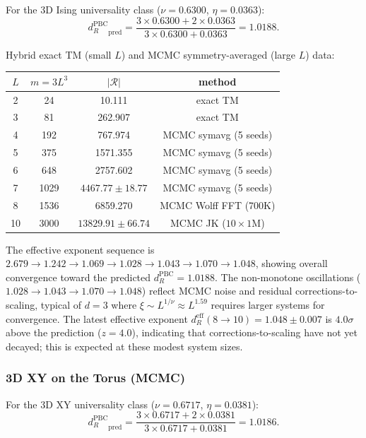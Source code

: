 \documentclass[11pt]{article}
\theoremstyle{definition}
\theoremstyle{remark}
\newcommand{\Scal}{\mathcal{R}}
\begin{document}
For the 3D Ising universality class ($\nu = 0.6300$, $\eta = 0.0363$):
\begin{equation}
  {d_R^{\mathrm{PBC}}}_{\text{pred}} = \frac{3 \times 0.6300 + 2 \times 0.0363}
    {3 \times 0.6300 + 0.0363} = 1.0188.
  \label{eq:pbc-3d-pred}
\end{equation}

Hybrid exact TM (small $L$) and MCMC symmetry-averaged (large $L$) data:

\begin{center}
\renewcommand{\arraystretch}{1.2}
\begin{tabular}{cccc}
\toprule
$L$ & $m = 3L^3$ & $|\Scal|$ & method \\
\midrule
2 & 24   & 10.111  & exact TM \\
3 & 81   & 262.907 & exact TM \\
4 & 192  & 767.974 & MCMC symavg (5 seeds) \\
5 & 375  & 1571.355 & MCMC symavg (5 seeds) \\
6 & 648  & 2757.602 & MCMC symavg (5 seeds) \\
7 & 1029 & $4467.77 \pm 18.77$ & MCMC symavg (5 seeds) \\
8 & 1536 & 6859.270 & MCMC Wolff FFT (700K) \\
10 & 3000 & $13829.91 \pm 66.74$ & MCMC JK ($10 \times 1$M) \\
\bottomrule
\end{tabular}
\end{center}

The effective exponent sequence is $2.679 \to 1.242 \to 1.069 \to 1.028 \to 1.043 \to 1.070 \to 1.048$,
showing overall convergence toward the predicted $d_R^{\mathrm{PBC}} = 1.0188$.
The non-monotone oscillations ($1.028 \to 1.043 \to 1.070 \to 1.048$)
reflect MCMC noise and residual corrections-to-scaling, typical of $d = 3$
where $\xi \sim L^{1/\nu} \approx L^{1.59}$ requires larger systems for convergence.
The latest effective exponent $d_R^{\mathrm{eff}}(8{\to}10) = 1.048 \pm 0.007$
is $4.0\sigma$ above the prediction ($z = 4.0$), indicating that corrections-to-scaling
have not yet decayed; this is expected at these modest system sizes.

\subsubsection{3D XY on the Torus (MCMC)}

For the 3D XY universality class ($\nu = 0.6717$, $\eta = 0.0381$):
\begin{equation}
  {d_R^{\mathrm{PBC}}}_{\text{pred}} = \frac{3 \times 0.6717 + 2 \times 0.0381}
    {3 \times 0.6717 + 0.0381} = 1.0186.
  \label{eq:pbc-3dxy-pred}
\end{equation}
\end{document}
